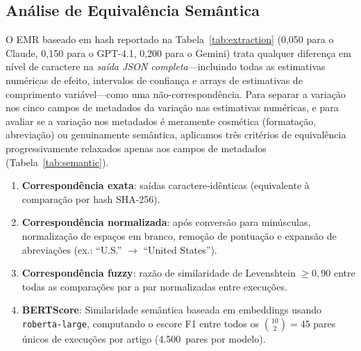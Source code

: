 \documentclass[12pt, a4paper]{article}
\begin{document}
\subsection{Análise de Equivalência Semântica}
\label{sec:semantic}

O EMR baseado em hash reportado na Tabela~\ref{tab:extraction} (0,050 para o Claude, 0,150 para o GPT-4.1, 0,200 para o Gemini) trata qualquer diferença em nível de caractere na \emph{saída JSON completa}---incluindo todas as estimativas numéricas de efeito, intervalos de confiança e arrays de estimativas de comprimento variável---como uma não-correspondência.
Para separar a variação nos cinco campos de metadados da variação nas estimativas numéricas, e para avaliar se a variação nos metadados é meramente cosmética (formatação, abreviação) ou genuinamente semântica, aplicamos três critérios de equivalência progressivamente relaxados apenas aos campos de metadados (Tabela~\ref{tab:semantic}).

\begin{enumerate}
  \item \textbf{Correspondência exata}: saídas caractere-idênticas (equivalente à comparação por hash SHA-256).
  \item \textbf{Correspondência normalizada}: após conversão para minúsculas, normalização de espaços em branco, remoção de pontuação e expansão de abreviações (ex.: ``U.S.'' $\to$ ``United States'').
  \item \textbf{Correspondência fuzzy}: razão de similaridade de Levenshtein $\geq\!0,90$ entre todas as comparações par a par normalizadas entre execuções.
  \item \textbf{BERTScore}: Similaridade semântica baseada em embeddings usando \texttt{roberta-large}, computando o escore F1 entre todos os $\binom{10}{2}{=}45$ pares únicos de execuções por artigo (4.500~pares por modelo).
\end{enumerate}
\end{document}

